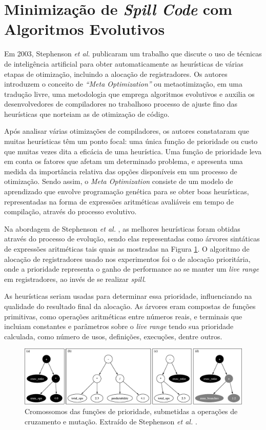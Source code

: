 \documentclass[
	12pt,				%
	openright,			%
	twoside,			%
	a4paper,			%
	tcc,			%
	]{ABNT-DC-UEL}
\begin{document}
\section{Minimização de \textit{Spill Code} com Algoritmos Evolutivos}

Em 2003, Stephenson \textit{et al.} \cite{amarasinghe:03} publicaram um trabalho que discute o uso de técnicas de inteligência artificial para obter automaticamente as heurísticas de várias etapas de otimização, incluindo a alocação de registradores. Os autores introduzem o conceito de \textit{``Meta Optimization''} ou metaotimização, em uma tradução livre, uma metodologia que emprega algoritmos evolutivos e auxilia os desenvolvedores de compiladores no trabalhoso processo de ajuste fino das heurísticas que norteiam as de otimização de código.

Após analisar várias otimizações de compiladores, os autores constataram que muitas heurísticas têm um ponto focal: uma única função de prioridade ou custo que muitas vezes dita a eficácia de uma heurística. Uma função de prioridade leva em conta os fatores que afetam um determinado problema, e apresenta uma medida da importância relativa das opções disponíveis em um processo de otimização. Sendo assim, o \textit{Meta Optimization} consiste de um modelo de aprendizado que envolve programação genética para se obter boas heurísticas, representadas na forma de expressões aritméticas avaliáveis em tempo de compilação, através do processo evolutivo.

Na abordagem de Stephenson \textit{et al.} \cite{amarasinghe:03}, as melhores heurísticas foram obtidas através do processo de evolução, sendo elas representadas como árvores sintáticas de expressões aritméticas tais quais as mostradas na Figura \ref{fig:stephenson}. O algoritmo de alocação de registradores usado nos experimentos foi o de alocação prioritária, onde a prioridade representa o ganho de performance ao se manter um \textit{live range} em registradores, ao invés de se realizar \textit{spill}. 

As heurísticas seriam usadas para determinar essa prioridade, influenciando na qualidade do resultado final da alocação. As árvores eram compostas de funções primitivas, como operações aritméticas entre números reais, e terminais que incluiam constantes e parâmetros sobre o \textit{live range} tendo sua prioridade calculada, como número de usos, definições, execuções, dentre outros. 

\begin{figure}[hbt]
    \centering
    \includegraphics[width=\textwidth]{stephenson}
    \caption{Cromossomos das funções de prioridade, submetidas a operações de cruzamento e mutação. Extraído de Stephenson \textit{et al.} \cite{amarasinghe:03}.}
    \label{fig:stephenson}
\end{figure}
\end{document}
